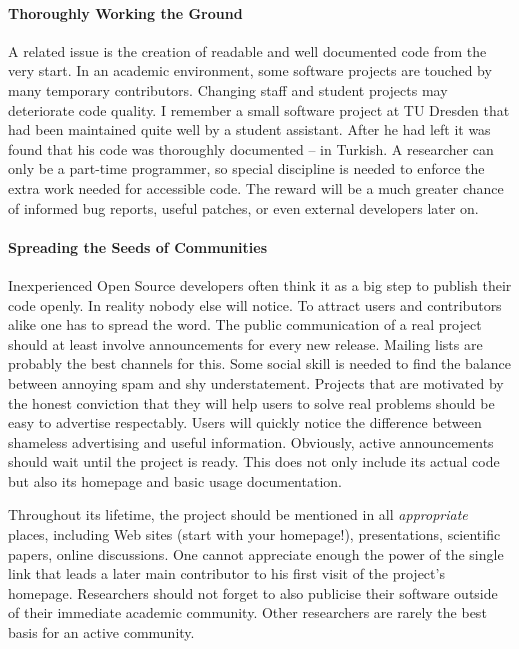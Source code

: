 \paragraph*{Thoroughly Working the Ground}
A related issue is the creation of readable and well documented code from the very start. In an academic environment, some software projects are touched by many temporary contributors. Changing staff and student projects may deteriorate code quality. I remember a small software project at TU Dresden that had been maintained quite well by a student assistant. After he had left it was found that his code was thoroughly documented -- in Turkish. A researcher can only be a part-time programmer, so special discipline is needed to enforce the extra work needed for accessible code. The reward will be a much greater chance of informed bug reports, useful patches, or even external developers later on.

\paragraph*{Spreading the Seeds of Communities}
Inexperienced Open Source developers often think it as a big step to publish their code openly. In reality nobody else will notice. To attract users and contributors alike one has to spread the word. The public communication of a real project should at least involve announcements for every new release. Mailing lists are probably the best channels for this. Some social skill is needed to find the balance between annoying spam and shy understatement. Projects that are motivated by the honest conviction that they will help users to solve real problems should be easy to advertise respectably. Users will quickly notice the difference between shameless advertising and useful information. Obviously, active announcements should wait until the project is ready. This does not only include its actual code but also its homepage and basic usage documentation.

Throughout its lifetime, the project should be mentioned in all \emph{appropriate} places, including Web sites (start with your homepage!), presentations, scientific papers, online discussions. One cannot appreciate enough the power of the single link that leads a later main contributor to his first visit of the project's homepage. Researchers should not forget to also publicise their software outside of their immediate academic community. Other researchers are rarely the best basis for an active community.

